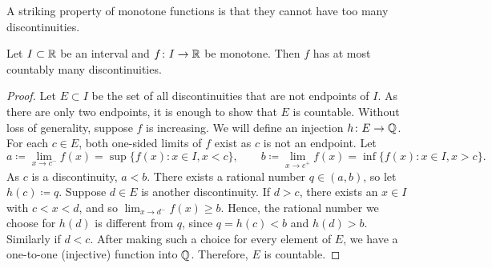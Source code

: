 A striking property of monotone functions is that they cannot have
too many discontinuities.

\begin{cor} \label{cor:monotcountcont}
Let $I \subset {\mathbb{R}}$ be an interval and
$f \colon I \to {\mathbb{R}}$ be monotone.  Then $f$ has at most
countably many discontinuities.
\end{cor}

\begin{proof}
Let $E \subset I$ be the set of all discontinuities
that are not endpoints of $I$.  As there are
only two endpoints, it is enough to show that $E$ is countable.
Without loss of generality, suppose $f$ is increasing.
We will define an injection $h \colon E \to {\mathbb{Q}}$.
For each $c \in E$,
both one-sided limits of $f$ exist as $c$ is not an endpoint.
Let
\begin{equation*}
a
\coloneqq \lim_{x \to c^-} f(x) = \sup \bigl\{ f(x) : x \in I, x < c \bigr\} ,
\qquad
b
\coloneqq \lim_{x \to c^+} f(x) = \inf \bigl\{ f(x) : x \in I, x > c \bigr\} .
\end{equation*}
As $c$ is a discontinuity, $a < b$.  
There exists a rational number $q \in (a,b)$, so let $h(c) \coloneqq q$.
Suppose $d \in E$ is another discontinuity.
If $d > c$, there
exists an $x \in I$ with $c < x < d$, and so $\lim_{x \to d^-} f(x) \geq b$.
Hence, the rational number we choose for $h(d)$ is different from $q$,
since $q=h(c) < b$ and $h(d) > b$.
Similarly if $d < c$.  After making such a choice for
every element of $E$, we have a 
one-to-one (injective) function into ${\mathbb{Q}}$.  Therefore, $E$ is countable.
\end{proof}

